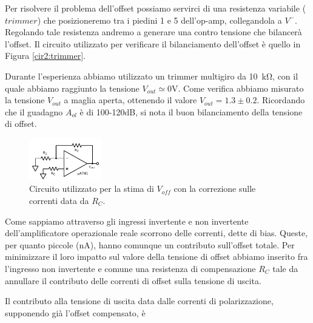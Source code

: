 
Per risolvere il problema dell'offset possiamo servirci di una resistenza variabile ($trimmer$) che posizioneremo tra i piedini 1 e 5 dell'op-amp, collegandola a $V^-$. Regolando tale resistenza andremo a generare una contro tensione che bilancerà l'offset. Il circuito utilizzato per verificare il bilanciamento dell'offset è quello in Figura \ref{cir2:trimmer}.

Durante l'esperienza abbiamo utilizzato un trimmer multigiro da \SI{10}{\kilo\ohm}, con il quale abbiamo raggiunto la tensione $V_{out}\simeq 0\si{\volt}$. Come verifica abbiamo misurato la tensione $V_{out}$ a maglia aperta, ottenendo il valore $V_{out}=1.3\pm0.2$. Ricordando che il guadagno $A_{ol}$ è di 100-120dB, si nota il buon bilanciamento della tensione di offset.

\begin{figure}
  \begin{center}
    \includegraphics[width=0.280\textwidth]{../E02/latex/current_correction.pdf}
  \end{center}
  \caption{Circuito utilizzato per la stima di $V_{off}$ con la correzione sulle correnti data da $R_C$.}
  \label{cir2:current_correction}
\end{figure}

Come sappiamo attraverso gli ingressi invertente e non invertente dell'amplificatore operazionale reale scorrono delle correnti, dette di bias. Queste, per quanto piccole (\si{\nano\ampere}), hanno comunque un contributo sull'offset totale. Per minimizzare il loro impatto sul valore della tensione di offset abbiamo inserito fra l'ingresso non invertente e comune una resistenza di compensazione $R_C$ tale da annullare il contributo delle correnti di offset sulla tensione di uscita.

Il contributo alla tensione di uscita data dalle correnti di polarizzazione, supponendo già l'offset compensato, è

